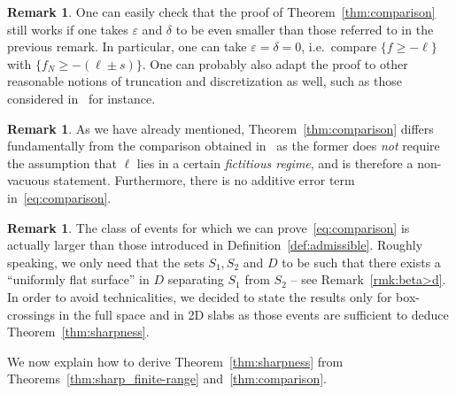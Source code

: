 \documentclass[10pt]{amsart}
\theoremstyle{definition}\newtheorem{defi}[theo]{Definition}\newtheorem{rema}[theo]{Remark}\newtheorem{exam}[theo]{Example}\newtheorem{exem}[theo]{Example}\newtheorem{nota}[theo]{Notation}
\begin{document}
\begin{rema}\label{rmk:delta=0}
One can easily check that the proof of Theorem~\ref{thm:comparison} still works if one takes $\varepsilon$ and $\delta$ to be even smaller than those referred to in the previous remark. In particular, one can take $\varepsilon=\delta=0$, i.e.~compare $\{f\geq -\ell\}$ with $\{f_N\geq -(\ell\pm s)\}$. One can probably also adapt the proof to other reasonable notions of truncation and discretization as well, such as those considered in~\cite{MV} for instance.
\end{rema}

\begin{rema}\label{rmk:paper_vs_GFF}
As we have already mentioned, Theorem~\ref{thm:comparison} differs fundamentally from the comparison obtained in~\cite[Proposition~1.4]{DGRS19} as the former does \emph{not} require the assumption that $\ell$ lies in a certain \emph{fictitious regime}, and is therefore a non-vacuous statement. Furthermore, there is no additive error term in~\eqref{eq:comparison}.
\end{rema}

\begin{rema}\label{rmk:admissible_events}
The class of events for which we can prove~\eqref{eq:comparison} is actually larger than those introduced in Definition~\ref{def:admissible}. Roughly speaking, we only need that the sets $S_1, S_2$ and $D$ to be such that there exists a ``uniformly flat surface'' in $D$ separating $S_1$ from $S_2$ -- see Remark~\ref{rmk:beta>d}. In order to avoid technicalities, we decided to state the results only for box-crossings in the full space and in 2D slabs as those events are sufficient to deduce Theorem~\ref{thm:sharpness}.
\end{rema}


We now explain how to derive Theorem~\ref{thm:sharpness} from Theorems~\ref{thm:sharp_finite-range} and~\ref{thm:comparison}.
\end{document}
